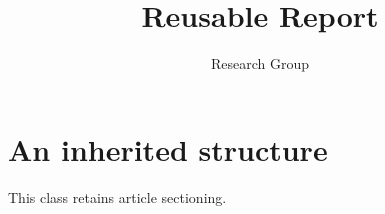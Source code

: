 \documentclass[11pt]{atelierreport}
\title{Reusable Report}\author{Research Group}\date{}
\begin{document}
\section{An inherited structure}This class retains article sectioning.
\end{document}
